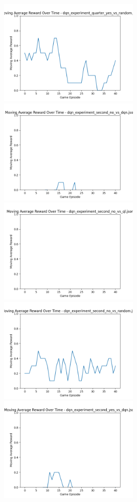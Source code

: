 \includegraphics[width=0.5\textwidth]{images/moving_average_reward_dqn_experiment_quarter_yes_vs_random.png} 
\includegraphics[width=0.5\textwidth]{images/moving_average_reward_dqn_experiment_second_no_vs_dqn.png} 
\includegraphics[width=0.5\textwidth]{images/moving_average_reward_dqn_experiment_second_no_vs_ql.png} 
\includegraphics[width=0.5\textwidth]{images/moving_average_reward_dqn_experiment_second_no_vs_random.png} 
\includegraphics[width=0.5\textwidth]{images/moving_average_reward_dqn_experiment_second_yes_vs_dqn.png} 
